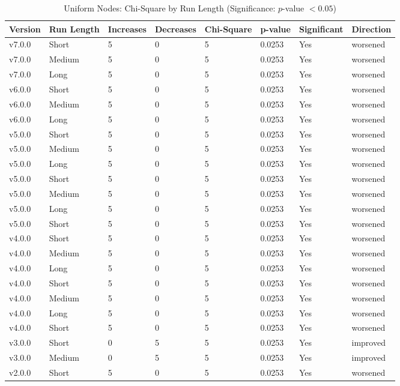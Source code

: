 \begin{table}[H]\caption{Uniform Nodes: Chi-Square by Run Length (Significance: $p$-value $<0.05$)}
\centering\footnotesize\setlength{\tabcolsep}{4pt}\renewcommand{\arraystretch}{1.15}
\begin{tabular}{llllllll}
\toprule
Version & Run Length & Increases & Decreases & Chi-Square & p-value & Significant & Direction \\ \midrule
v7.0.0 & Short & 5 & 0 & 5 & 0.0253 & Yes & worsened \\
v7.0.0 & Medium & 5 & 0 & 5 & 0.0253 & Yes & worsened \\
v7.0.0 & Long & 5 & 0 & 5 & 0.0253 & Yes & worsened \\
v6.0.0 & Short & 5 & 0 & 5 & 0.0253 & Yes & worsened \\
v6.0.0 & Medium & 5 & 0 & 5 & 0.0253 & Yes & worsened \\
v6.0.0 & Long & 5 & 0 & 5 & 0.0253 & Yes & worsened \\
v5.0.0 & Short & 5 & 0 & 5 & 0.0253 & Yes & worsened \\
v5.0.0 & Medium & 5 & 0 & 5 & 0.0253 & Yes & worsened \\
v5.0.0 & Long & 5 & 0 & 5 & 0.0253 & Yes & worsened \\
v5.0.0 & Short & 5 & 0 & 5 & 0.0253 & Yes & worsened \\
v5.0.0 & Medium & 5 & 0 & 5 & 0.0253 & Yes & worsened \\
v5.0.0 & Long & 5 & 0 & 5 & 0.0253 & Yes & worsened \\
v5.0.0 & Short & 5 & 0 & 5 & 0.0253 & Yes & worsened \\
v4.0.0 & Short & 5 & 0 & 5 & 0.0253 & Yes & worsened \\
v4.0.0 & Medium & 5 & 0 & 5 & 0.0253 & Yes & worsened \\
v4.0.0 & Long & 5 & 0 & 5 & 0.0253 & Yes & worsened \\
v4.0.0 & Short & 5 & 0 & 5 & 0.0253 & Yes & worsened \\
v4.0.0 & Medium & 5 & 0 & 5 & 0.0253 & Yes & worsened \\
v4.0.0 & Long & 5 & 0 & 5 & 0.0253 & Yes & worsened \\
v4.0.0 & Short & 5 & 0 & 5 & 0.0253 & Yes & worsened \\
v3.0.0 & Short & 0 & 5 & 5 & 0.0253 & Yes & improved \\
v3.0.0 & Medium & 0 & 5 & 5 & 0.0253 & Yes & improved \\
v2.0.0 & Short & 5 & 0 & 5 & 0.0253 & Yes & worsened \\
\bottomrule\end{tabular}
\label{ChiUniformNodes}
\par\smallskip\parbox{0.95\textwidth}{\scriptsize}
\end{table}

